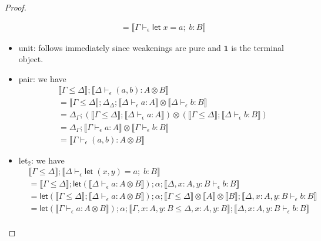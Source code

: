 \documentclass[acmsmall,screen,review]{acmart}
\newcommand{\mb}[1]{\ensuremath{\mathbf{#1}}}
\newcommand{\ms}[1]{\ensuremath{\mathsf{#1}}}
\newcommand{\letexpr}[3]{\ensuremath{\ms{let}\;#1 = #2;\;#3}}
\newcommand{\bhyp}[2]{#1 : #2}
\newcommand{\hasty}[4]{#1 \vdash_{#2} #3: {#4}}
\newcommand{\brle}[1]{{\textsf{#1}}}
\newcommand{\dnt}[1]{\llbracket{#1}\rrbracket}
\newcommand{\dmor}[1]{{\Delta}_{#1}}
\newcommand{\lmor}[1]{\ms{let}(#1)}
\begin{document}
\begin{proof}
\begin{itemize}
\begin{equation}
\begin{aligned}
        &= \dnt{\hasty{\Gamma}{\epsilon}{\letexpr{x}{a}{b}}{B}}
      \end{aligned}
    \end{equation}
    \item \brle{unit}: follows immediately since weakenings are pure and $\mb{1}$ is the terminal
    object.
    \item \brle{pair}: we have
    \begin{equation}
      \begin{aligned}
        & \dnt{\Gamma \leq \Delta} ; \dnt{\hasty{\Delta}{\epsilon}{(a, b)}{A \otimes B}} \\
        & = \dnt{\Gamma \leq \Delta} 
          ; \dmor{\Delta}
          ; \dnt{\hasty{\Delta}{\epsilon}{a}{A}} \otimes \dnt{\hasty{\Delta}{\epsilon}{b}{B}} \\
        & = \dmor{\Gamma}
          ; (\dnt{\Gamma \leq \Delta} ; \dnt{\hasty{\Delta}{\epsilon}{a}{A}}) \otimes
          (\dnt{\Gamma \leq \Delta} ; \dnt{\hasty{\Delta}{\epsilon}{b}{B}}) \\
        & = \dmor{\Gamma}
          ; \dnt{\hasty{\Gamma}{\epsilon}{a}{A}} \otimes \dnt{\hasty{\Gamma}{\epsilon}{b}{B}} \\
        & = \dnt{\hasty{\Gamma}{\epsilon}{(a, b)}{A \otimes B}}
      \end{aligned}
    \end{equation}
    \item \brle{let$_2$}: we have
    \begin{equation}
      \begin{aligned}
        & \dnt{\Gamma \leq \Delta} ; \dnt{\hasty{\Delta}{\epsilon}{\letexpr{(x, y)}{a}{b}}{B}} \\
        & = \dnt{\Gamma \leq \Delta} 
          ; \lmor{\dnt{\hasty{\Delta}{\epsilon}{a}{A \otimes B}}}
          ; \alpha 
          ; \dnt{\hasty{\Delta, \bhyp{x}{A}, \bhyp{y}{B}}{\epsilon}{b}{B}} \\
        & = \lmor{\dnt{\Gamma \leq \Delta} ; \dnt{\hasty{\Delta}{\epsilon}{a}{A \otimes B}}}
          ; \alpha
          ; \dnt{\Gamma \leq \Delta} \otimes \dnt{A} \otimes \dnt{B}
          ; \dnt{\hasty{\Delta, \bhyp{x}{A}, \bhyp{y}{B}}{\epsilon}{b}{B}} \\
        & = \lmor{\dnt{\hasty{\Gamma}{\epsilon}{a}{A \otimes B}}}
          ; \alpha
          ; \dnt{\Gamma, \bhyp{x}{A}, \bhyp{y}{B} \leq \Delta, \bhyp{x}{A}, \bhyp{y}{B}}
          ; \dnt{\hasty{\Delta, \bhyp{x}{A}, \bhyp{y}{B}}{\epsilon}{b}{B}} \\

\end{aligned}
\end{equation}
\end{itemize}
\end{proof}
\end{document}
